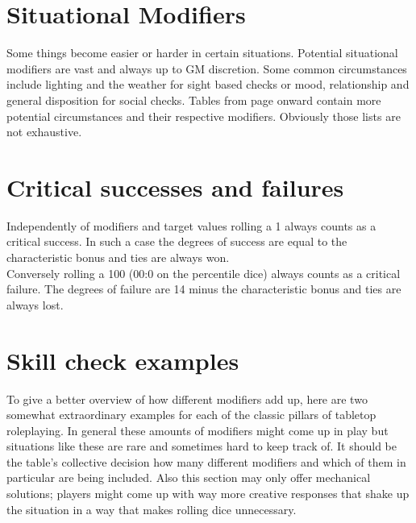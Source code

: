 \documentclass[12pt,a4paper,openany]{book}
\begin{document}
	\section{Situational Modifiers}
	Some things become easier or harder in certain situations. Potential situational modifiers are vast and always up to GM discretion. Some common circumstances include lighting and the weather for sight based checks or mood, relationship and general disposition for social checks. Tables from page \pageref{situationalmodifiers} onward contain more potential circumstances and their respective modifiers. Obviously those lists are not exhaustive.
	\section{Critical successes and failures}
	Independently of modifiers and target values rolling a 1 always counts as a critical success. In such a case the degrees of success are equal to the characteristic bonus and ties are always won.\\
	Conversely rolling a 100 (00:0 on the percentile dice) always counts as a critical failure. The degrees of failure are 14 minus the characteristic bonus and ties are always lost.
	\section{Skill check examples}
	To give a better overview of how different modifiers add up, here are two somewhat extraordinary examples for each of the classic pillars of tabletop roleplaying. In general these amounts of modifiers might come up in play but situations like these are rare and sometimes hard to keep track of.
	It should be the table’s collective decision how many different modifiers and which of them in particular are being included. Also this section may only offer mechanical solutions; players might come up with way more creative responses that shake up the situation in a way that makes rolling dice unnecessary.
\end{document}
